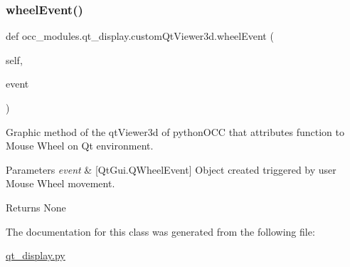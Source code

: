 \subsubsection{\texorpdfstring{wheel\+Event()}{wheelEvent()}}
{\footnotesize\ttfamily def occ\+\_\+modules.\+qt\+\_\+display.\+custom\+Qt\+Viewer3d.\+wheel\+Event (\begin{DoxyParamCaption}\item[{}]{self,  }\item[{}]{event }\end{DoxyParamCaption})}



Graphic method of the qt\+Viewer3d of python\+O\+CC that attributes function to Mouse Wheel on Qt environment. 


\begin{DoxyParams}{Parameters}
{\em event} & \mbox{[}Qt\+Gui.\+Q\+Wheel\+Event\mbox{]} Object created triggered by user Mouse Wheel movement. \\
\hline
\end{DoxyParams}
\begin{DoxyReturn}{Returns}
None 
\end{DoxyReturn}


The documentation for this class was generated from the following file\+:\begin{DoxyCompactItemize}
\item 
\hyperlink{qt__display_8py}{qt\+\_\+display.\+py}\end{DoxyCompactItemize}
